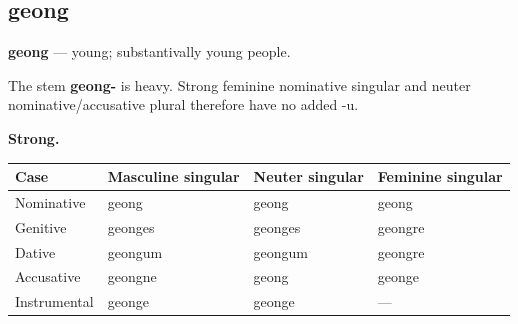 \subsection*{geong}

\par\begin{minipage}{\linewidth}\raggedright
\textbf{geong} — young; substantivally young people.

The stem \textbf{geong-} is heavy. Strong feminine nominative singular and neuter nominative/\allowbreak{}accusative plural therefore have no added -u.

\textbf{Strong.}

\par\begingroup
\fontsize{10.5}{13.2}\selectfont
\par\begin{minipage}{\linewidth}\raggedright
\setlength{\LTleft}{0pt}\setlength{\LTright}{\fill}
\noindent
\begin{tabular}{@{}>{\raggedright\arraybackslash}p{22mm}>{\raggedright\arraybackslash}p{31.18mm}>{\raggedright\arraybackslash}p{31.18mm}>{\raggedright\arraybackslash}p{31.18mm}@{}}
\toprule
\textbf{Case} & \textbf{Masculine singular} & \textbf{Neuter singular} & \textbf{Feminine singular} \\
\midrule
Nominative & geong & geong & geong \\
Genitive & geonges & geonges & geongre \\
Dative & geongum & geongum & geongre \\
Accusative & geongne & geong & geonge \\
Instrumental & geonge & geonge & — \\
\bottomrule
\end{tabular}
\end{minipage}\par
\par\endgroup
\end{minipage}\par
\par\addvspace{5pt}
\par\begingroup
\fontsize{10.5}{13.2}\selectfont
